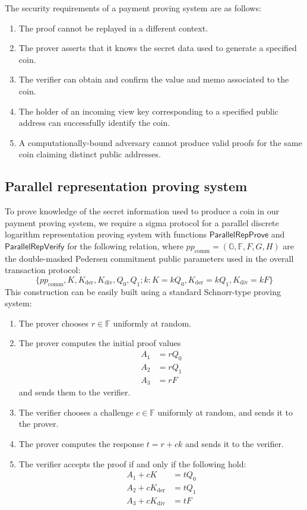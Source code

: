 \documentclass{llncs}
\newcommand{\G}{\mathbb{G}}
\newcommand{\F}{\mathbb{F}}
\newcommand{\func}[1]{\mathsf{#1}}
\begin{document}
The security requirements of a payment proving system are as follows:
\begin{enumerate}
    \item\label{pay:context} The proof cannot be replayed in a different context.
    \item\label{pay:secret} The prover asserts that it knows the secret data used to generate a specified coin.
    \item\label{pay:value_memo} The verifier can obtain and confirm the value and memo associated to the coin.
    \item\label{pay:identify} The holder of an incoming view key corresponding to a specified public address can successfully identify the coin.
    \item\label{pay:malicious} A computationally-bound adversary cannot produce valid proofs for the same coin claiming distinct public addresses.
\end{enumerate}


\subsection{Parallel representation proving system}

To prove knowledge of the secret information used to produce a coin in our payment proving system, we require a sigma protocol for a parallel discrete logarithm representation proving system with functions $\func{ParallelRepProve}$ and $\func{ParallelRepVerify}$ for the following relation, where $pp_{\text{comm}} = (\G,\F,F,G,H)$ are the double-masked Pedersen commitment public parameters used in the overall transaction protocol:
$$\{pp_{\text{comm}},K,K_{\text{der}},K_{\text{div}},Q_0,Q_1 ; k : K = kQ_0, K_{\text{der}} = kQ_1, K_{\text{div}} = kF \}$$
This construction can be easily built using a standard Schnorr-type proving system:

\begin{enumerate}
    \item The prover chooses $r \in \F$ uniformly at random.
    \item The prover computes the initial proof values
    \begin{align*}
        A_1 &= rQ_0 \\
        A_2 &= rQ_1 \\
        A_3 &= rF
    \end{align*}
    and sends them to the verifier.
    \item The verifier chooses a challenge $c \in \F$ uniformly at random, and sends it to the prover.
    \item The prover computes the response $t = r + ck$ and sends it to the verifier.
    \item The verifier accepts the proof if and only if the following hold:
    \begin{align*}
        A_1 + cK &= tQ_0 \\
        A_2 + cK_{\text{der}} &= tQ_1 \\
        A_3 + cK_{\text{div}} &= tF
    \end{align*}
\end{enumerate}
\end{document}

